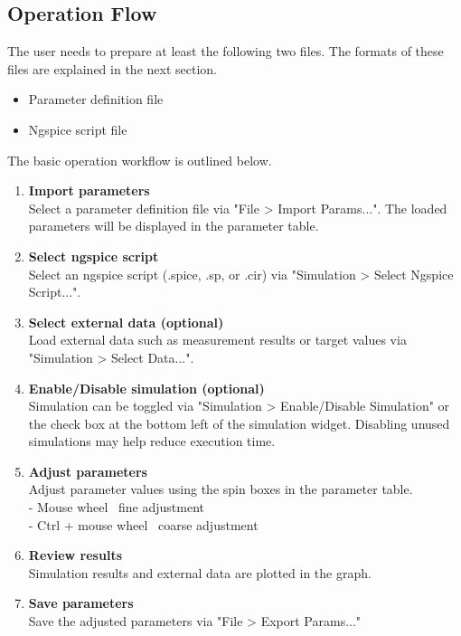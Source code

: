 \documentclass[a4paper,12pt,titlepage]{article}
\begin{document}
\subsection{Operation Flow}

The user needs to prepare at least the following two files. The formats of these files are
explained in the next section.

\begin{itemize}
    \setlength{\parskip}{0mm}
    \setlength{\itemsep}{0mm}
    \item Parameter definition file
    \item Ngspice script file
\end{itemize}

The basic operation workflow is outlined below.

\begin{enumerate}
    \item \textbf{Import parameters}\\
        Select a parameter definition file via "File > Import Params...".
        The loaded parameters will be displayed in the parameter table.
    \item \textbf{Select ngspice script}\\
        Select an ngspice script (.spice, .sp, or .cir) via
        "Simulation > Select Ngspice Script...".
    \item \textbf{Select external data (optional)}\\
        Load external data such as measurement results or target values via
        "Simulation > Select Data...".
    \item \textbf{Enable/Disable simulation (optional)}\\
        Simulation can be toggled via "Simulation > Enable/Disable Simulation" or the check box at
        the bottom left of the simulation widget. Disabling unused simulations may help reduce
        execution time.
    \item \textbf{Adjust parameters}\\
        Adjust parameter values using the spin boxes in the parameter table.\\
        - Mouse wheel \rightarrow\ fine adjustment\\
        - Ctrl + mouse wheel \rightarrow\ coarse adjustment
    \item \textbf{Review results}\\
        Simulation results and external data are plotted in the graph.
    \item \textbf{Save parameters}\\
        Save the adjusted parameters via "File > Export Params..."
\end{enumerate}
\end{document}
